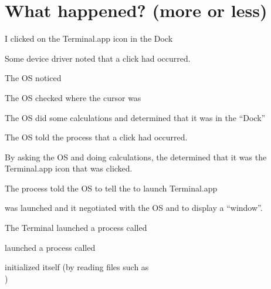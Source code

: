 \documentclass[landscape]{foils}
\begin{document}
\pagecolor{white}

\myNewSlide
\section*{What happened? (more or less)}
\begin{compactitem}
	\item I clicked on the Terminal.app icon in the Dock
	\item Some device driver noted that a click had occurred.
	\item The OS noticed
	\item The OS checked where the cursor was
	\item The OS did some calculations and determined that it was in the ``Dock''
	\item The OS told the  process that a click had occurred.
	\item By asking the OS and doing calculations, the  determined that it was the Terminal.app icon that was clicked.
	\item The  process told the OS to tell the  to launch Terminal.app
	\item {} was launched and it negotiated with the OS and  to display a ``window''.
	\item {\color{green} The Terminal launched a process called }
	\item {\color{blue}  launched a process called }
	\item {\color{red}  initialized itself (by reading files such as\\ )}
\end{compactitem}
\myNewSlide
\end{document}
